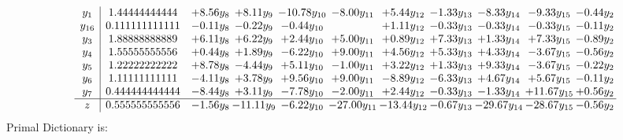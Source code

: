 \documentclass[9pt]{article}
\begin{document}
\[\begin{array}{c| c c@{\hskip 2pt} c@{\hskip 2pt} c@{\hskip 2pt} c@{\hskip 2pt} c@{\hskip 2pt} c@{\hskip 2pt} c@{\hskip 2pt} c@{\hskip 2pt} c@{\hskip 2pt} }
 y_{1}   &  1.44444444444 & +  8.56 y_{8} & +  8.11 y_{9} & -10.78 y_{10} & -8.00 y_{11} & +  5.44 y_{12} & -1.33 y_{13} & -8.33 y_{14} & -9.33 y_{15} & -0.44 y_{2}\\
 y_{16}   &  0.111111111111 & -0.11 y_{8} & -0.22 y_{9} & -0.44 y_{10} &   & +  1.11 y_{12} & -0.33 y_{13} & -0.33 y_{14} & -0.33 y_{15} & -0.11 y_{2}\\
 y_{3}   &  1.88888888889 & +  6.11 y_{8} & +  6.22 y_{9} & +  2.44 y_{10} & +  5.00 y_{11} & +  0.89 y_{12} & +  7.33 y_{13} & +  1.33 y_{14} & +  7.33 y_{15} & -0.89 y_{2}\\
 y_{4}   &  1.55555555556 & +  0.44 y_{8} & +  1.89 y_{9} & -6.22 y_{10} & +  9.00 y_{11} & +  4.56 y_{12} & +  5.33 y_{13} & +  4.33 y_{14} & -3.67 y_{15} & -0.56 y_{2}\\
 y_{5}   &  1.22222222222 & +  8.78 y_{8} & -4.44 y_{9} & +  5.11 y_{10} & -1.00 y_{11} & +  3.22 y_{12} & +  1.33 y_{13} & +  9.33 y_{14} & -3.67 y_{15} & -0.22 y_{2}\\
 y_{6}   &  1.11111111111 & -4.11 y_{8} & +  3.78 y_{9} & +  9.56 y_{10} & +  9.00 y_{11} & -8.89 y_{12} & -6.33 y_{13} & +  4.67 y_{14} & +  5.67 y_{15} & -0.11 y_{2}\\
 y_{7}   &  0.444444444444 & -8.44 y_{8} & +  3.11 y_{9} & -7.78 y_{10} & -2.00 y_{11} & +  2.44 y_{12} & -0.33 y_{13} & -1.33 y_{14} & + 11.67 y_{15} & +  0.56 y_{2}\\
\hline
z    &  0.555555555556 & -1.56 y_{8} & -11.11 y_{9} & -6.22 y_{10} & -27.00 y_{11} & -13.44 y_{12} & -0.67 y_{13} & -29.67 y_{14} & -28.67 y_{15} & -0.56 y_{2}\\
\end{array}\]
Primal Dictionary is:
\end{document}
